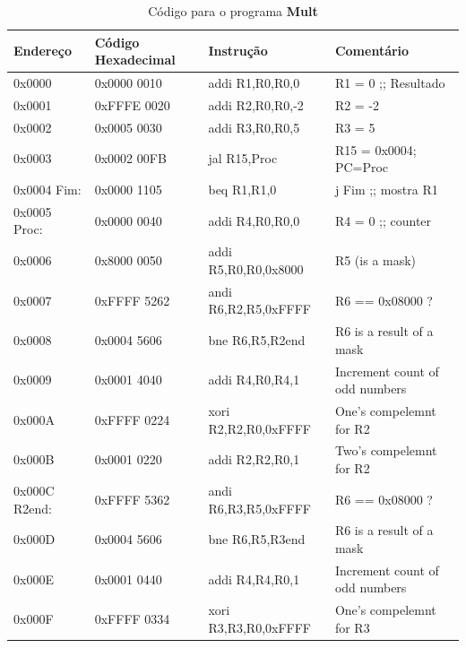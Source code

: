 \documentclass[12pt]{article}
\begin{document}
\begin{table}[H]
    \centering
    \caption{Código para o programa \textbf{Mult}}
    \begin{tabular}{|l|l|l|l|}\hline
        \textbf{Endereço} & \textbf{Código Hexadecimal} & \textbf{Instrução} & \textbf{Comentário}\\\hline
        0x0000        & 0x0000 0010 & addi R1,R0,R0,0      & R1 = 0 ;; Resultado            \\\hline
        0x0001        & 0xFFFE 0020 & addi R2,R0,R0,-2     & R2 = -2                        \\\hline
        0x0002        & 0x0005 0030 & addi R3,R0,R0,5      & R3 = 5                         \\\hline
        0x0003        & 0x0002 00FB & jal  R15,Proc        & R15 = 0x0004; PC=Proc          \\\hline
        0x0004 Fim:   & 0x0000 1105 & beq  R1,R1,0         & j Fim ;; mostra R1             \\\hline
        0x0005 Proc:  & 0x0000 0040 & addi R4,R0,R0,0      & R4 = 0 ;; counter              \\\hline
        0x0006        & 0x8000 0050 & addi R5,R0,R0,0x8000 & R5 (is a mask)                 \\\hline
        0x0007        & 0xFFFF 5262 & andi R6,R2,R5,0xFFFF & R6 == 0x08000 ?                \\\hline
        0x0008        & 0x0004 5606 & bne  R6,R5,R2end     & R6 is a result of a mask       \\\hline
        0x0009        & 0x0001 4040 & addi R4,R0,R4,1      & Increment count of odd numbers \\\hline
        0x000A        & 0xFFFF 0224 & xori R2,R2,R0,0xFFFF & One's compelemnt for R2        \\\hline
        0x000B        & 0x0001 0220 & addi R2,R2,R0,1      & Two's compelemnt for R2        \\\hline
        0x000C R2end: & 0xFFFF 5362 & andi R6,R3,R5,0xFFFF & R6 == 0x08000 ?                \\\hline
        0x000D        & 0x0004 5606 & bne  R6,R5,R3end     & R6 is a result of a mask       \\\hline
        0x000E        & 0x0001 0440 & addi R4,R4,R0,1      & Increment count of odd numbers \\\hline
        0x000F        & 0xFFFF 0334 & xori R3,R3,R0,0xFFFF & One's compelemnt for R3        \\\hline

\end{tabular}
\end{table}
\end{document}
